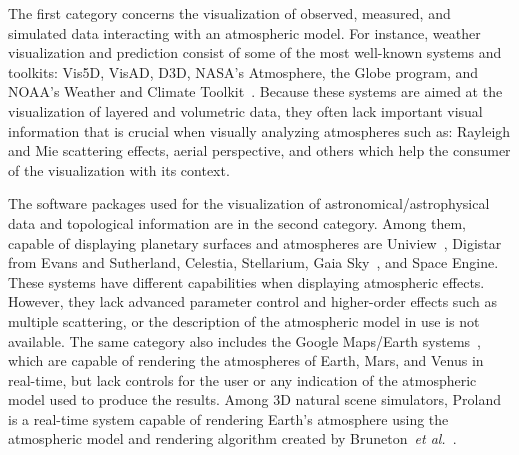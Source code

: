 \documentclass[journal]{vgtc}                %
\newcommand{\etal}{\emph{et al.}}
\newcommand{\review}[1]{{\color{blue}#1}}
\begin{document}
\review{The first category concerns the visualization of observed, measured, and simulated data interacting with an atmospheric model. For instance, weather visualization and prediction consist} of some of the most well-known systems and toolkits: Vis5D, VisAD, D3D, NASA's Atmosphere, the Globe program, and NOAA's Weather and Climate Toolkit~\cite{NOAAWeatherClimate}. \review{Because these systems are aimed at the visualization of layered and volumetric data, they often lack important visual information that is crucial when visually analyzing atmospheres such as: Rayleigh and Mie scattering effects, aerial perspective, and others which help the consumer of the visualization with its context.}

\review{The software packages used for the visualization of astronomical/astrophysical data and topological information are in the second category.} Among them, capable of \review{displaying} planetary surfaces and atmospheres are Uniview~\cite{klashed10uniview}, Digistar from Evans and Sutherland, Celestia, Stellarium, Gaia Sky~\cite{GaiaSky2018}, and Space Engine. These systems have different capabilities when displaying atmospheric \review{effects. However,} they lack advanced parameter control and higher-order effects such as multiple scattering, or the description of the atmospheric model in use is not available. The same category also includes the Google Maps/Earth systems~\cite{GoogleEarth:2017}\review{, which are capable of rendering the atmospheres of Earth, Mars, and Venus in real-time, but lack controls} for the user or any indication of the atmospheric model used to produce the results. \review{Among 3D natural scene simulators}, Proland is a real-time system capable of rendering Earth's atmosphere using the atmospheric model and rendering algorithm created by Bruneton~\etal~\cite{BrunetonNeyret:2008}.


\end{document}
